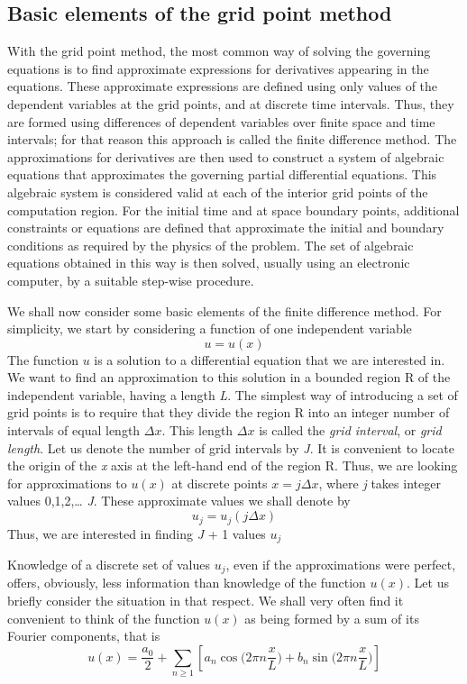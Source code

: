 \subsection{Basic elements of the grid point method}
With the grid point method, the most common way of solving the governing equations is to find approximate expressions for derivatives appearing in the equations. These approximate expressions are defined using only values of the dependent variables at the grid points, and at discrete time intervals. Thus, they are formed using differences of dependent variables over finite space and time intervals; for that reason this approach is called the finite difference method. The approximations for derivatives are then used to construct a system of algebraic equations that approximates the governing partial differential equations. This algebraic system is considered valid at each of the interior grid points of the computation region. For the initial time and at space boundary points, additional constraints or equa­tions are defined that approximate the initial and bound­ary conditions as required by the physics of the problem. The set of algebraic equations obtained in this way is then solved, usually using an electronic computer, by a suitable step-wise procedure.

We shall now consider some basic elements of the finite difference method. For simplicity, we start by considering a function of one independent variable $$u=u(x)$$
The function $u$ is a solution to a differential equation that we are interested in. We want to find an approxima­tion to this solution in a bounded region R of the inde­pendent variable, having a length \textit{L}. The simplest way of introducing a set of grid points is to require that they divide the region R into an integer number of intervals of equal length $\Delta x$. This length $\Delta x$ is called the \textit{grid interval}, or \textit{grid length}. Let us denote the number of grid intervals by \textit{J}. It is convenient to locate the origin of the \textit{x} axis at the left-hand end of the region R. Thus, we are looking for approximations to $u(x)$ at discrete points $x=j\Delta x$, where \textit{j} takes integer values 0,1,2,… \textit{J}. These approximate values we shall denote by $$u_j=u_j(j\Delta x)$$
Thus, we are interested in finding \textit{J} + 1 values $u_j$

Knowledge of a discrete set of values $u_j$, even if the approximations were perfect, offers, obviously, less information than knowledge of the function $u(x)$. Let us briefly consider the situation in that respect. We shall very often find it convenient to think of the function $u(x)$ as being formed by a sum of its Fourier compo­nents, that is
$$u(x)=\frac{a_0}{2}+\displaystyle\sum_{n\geq 1}[a_n\cos\big(2\pi n\frac{x}{L}\big)+b_n\sin\big(2\pi n\frac{x}{L}\big)]$$

